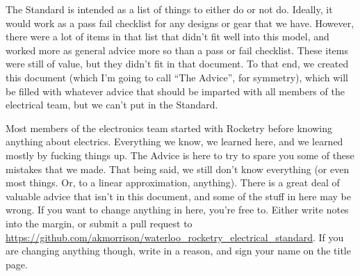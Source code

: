 \documentclass{article}
\begin{document}
The Standard is intended as a list of things to either do or not do. Ideally, it would work as a pass fail checklist for any designs or gear that we have. However, there were a lot of items in that list that didn't fit well into this model, and worked more as general advice more so than a pass or fail checklist. These items were still of value, but they didn't fit in that document. To that end, we created this document (which I'm going to call ``The Advice'', for symmetry), which will be filled with whatever advice that should be imparted with all members of the electrical team, but we can't put in the Standard.

Most members of the electronics team started with Rocketry before knowing anything about electrics. Everything we know, we learned here, and we learned mostly by fucking things up. The Advice is here to try to spare you some of these mistakes that we made. That being said, we still don't know everything (or even most things. Or, to a linear approximation, anything). There is a great deal of valuable advice that isn't in this document, and some of the stuff in here may be wrong. If you want to change anything in here, you're free to. Either write notes into the margin, or submit a pull request to \url{https://github.com/akmorrison/waterloo_rocketry_electrical_standard}. If you are changing anything though, write in a reason, and sign your name on the title page.

\end{document}
